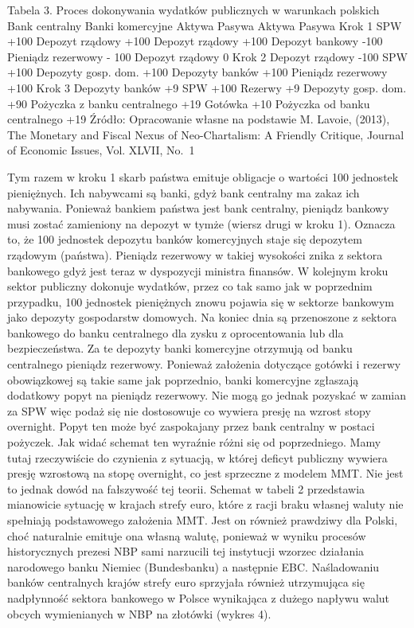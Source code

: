 \documentclass[
]{book}
\begin{document}
Tabela 3. Proces dokonywania wydatków publicznych w warunkach polskich Bank centralny Banki komercyjne Aktywa Pasywa Aktywa Pasywa Krok 1 SPW +100 Depozyt rządowy +100 Depozyt rządowy +100 Depozyt bankowy -100 Pieniądz rezerwowy - 100 Depozyt rządowy 0 Krok 2 Depozyt rządowy -100 SPW +100 Depozyty gosp. dom. +100 Depozyty banków +100 Pieniądz rezerwowy +100 Krok 3 Depozyty banków +9 SPW +100 Rezerwy +9 Depozyty gosp. dom. +90 Pożyczka z banku centralnego +19 Gotówka +10 Pożyczka od banku centralnego +19 Źródło: Opracowanie własne na podstawie M. Lavoie, (2013), The Monetary and Fiscal Nexus of Neo-Chartalism: A Friendly Critique, Journal of Economic Issues, Vol. XLVII, No.~1

Tym razem w kroku 1 skarb państwa emituje obligacje o wartości 100 jednostek pieniężnych. Ich nabywcami są banki, gdyż bank centralny ma zakaz ich nabywania. Ponieważ bankiem państwa jest bank centralny, pieniądz bankowy musi zostać zamieniony na depozyt w tymże (wiersz drugi w kroku 1). Oznacza to, że 100 jednostek depozytu banków komercyjnych staje się depozytem rządowym (państwa). Pieniądz rezerwowy w takiej wysokości znika z sektora bankowego gdyż jest teraz w dyspozycji ministra finansów. W kolejnym kroku sektor publiczny dokonuje wydatków, przez co tak samo jak w poprzednim przypadku, 100 jednostek pieniężnych znowu pojawia się w sektorze bankowym jako depozyty gospodarstw domowych. Na koniec dnia są przenoszone z sektora bankowego do banku centralnego dla zysku z oprocentowania lub dla bezpieczeństwa. Za te depozyty banki komercyjne otrzymują od banku centralnego pieniądz rezerwowy. Ponieważ założenia dotyczące gotówki i rezerwy obowiązkowej są takie same jak poprzednio, banki komercyjne zgłaszają dodatkowy popyt na pieniądz rezerwowy. Nie mogą go jednak pozyskać w zamian za SPW więc podaż się nie dostosowuje co wywiera presję na wzrost stopy overnight. Popyt ten może być zaspokajany przez bank centralny w postaci pożyczek. Jak widać schemat ten wyraźnie różni się od poprzedniego. Mamy tutaj rzeczywiście do czynienia z sytuacją, w której deficyt publiczny wywiera presję wzrostową na stopę overnight, co jest sprzeczne z modelem MMT. Nie jest to jednak dowód na fałszywość tej teorii. Schemat w tabeli 2 przedstawia mianowicie sytuację w krajach strefy euro, które z racji braku własnej waluty nie spełniają podstawowego założenia MMT. Jest on również prawdziwy dla Polski, choć naturalnie emituje ona własną walutę, ponieważ w wyniku procesów historycznych prezesi NBP sami narzucili tej instytucji wzorzec działania narodowego banku Niemiec (Bundesbanku) a następnie EBC. Naśladowaniu banków centralnych krajów strefy euro sprzyjała również utrzymująca się nadpłynność sektora bankowego w Polsce wynikająca z dużego napływu walut obcych wymienianych w NBP na złotówki (wykres 4).
\end{document}

